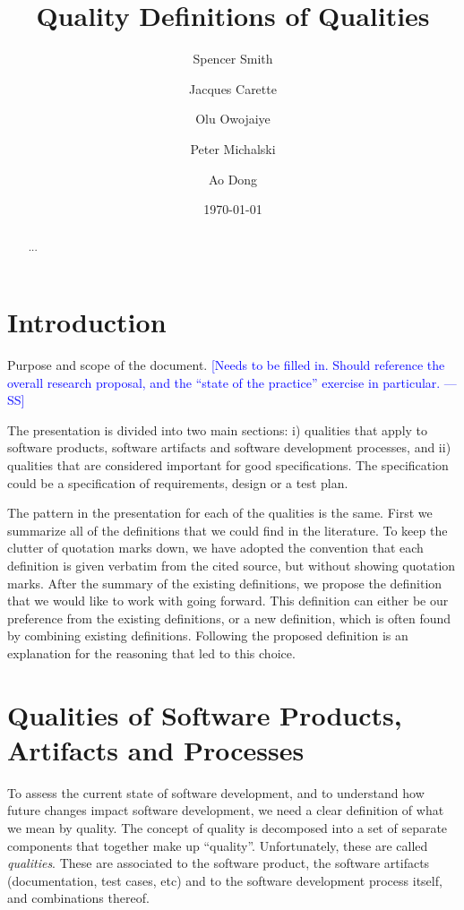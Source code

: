 \documentclass[letterpaper,cleveref]{lipics-v2019}
\title{Quality Definitions of Qualities}
\author{Spencer Smith}{McMaster University, Canada}{smiths@mcmaster.ca}{}{}
\author{Jacques Carette}{McMaster University, Canada}{carette@mcmaster.ca}{}{}
\author{Olu Owojaiye}{McMaster University, Canada}{owojaiyo@mcmaster.ca}{}{}
\author{Peter Michalski}{McMaster University, Canada}{michap@mcmaster.ca}{}{}
\author{Ao Dong}{McMaster University, Canada}{}{}{}
\date{\today}
\newcommand{\authornote}[3]{\textcolor{#1}{[#3 ---#2]}}
\newcommand{\authornote}[3]{}
\newcommand{\wss}[1]{\authornote{blue}{SS}{#1}} %
\theoremstyle{definition}
\begin{document}
\maketitle

\begin{abstract}
	...
\end{abstract}

\tableofcontents

\section{Introduction} \label{SecIntroduction}

Purpose and scope of the document.  \wss{Needs to be filled in.  Should
	reference the overall research proposal, and the ``state of the practice''
	exercise in particular.}

The presentation is divided into two main sections: i) qualities that apply to
software products, software artifacts and software development processes, and
ii) qualities that are considered important for good specifications.  The
specification could be a specification of requirements, design or a test plan.

The pattern in the presentation for each of the qualities is the same.  First we
summarize all of the definitions that we could find in the literature.  To keep
the clutter of quotation marks down, we have adopted the convention that each
definition is given verbatim from the cited source, but without showing
quotation marks.  After the summary of the existing definitions, we propose the
definition that we would like to work with going forward.  This definition can
either be our preference from the existing definitions, or a new definition,
which is often found by combining existing definitions.  Following the proposed
definition is an explanation for the reasoning that led to this choice.

\section{Qualities of Software Products, Artifacts and
	Processes} \label{SecQualities}

To assess the current state of software development, and to understand how
future changes impact software development, we need a clear definition of what
we mean by quality.  The concept of quality is decomposed into a set of separate
components that together make up ``quality''. Unfortunately, these are
called \emph{qualities}. These are associated to the software product,
the software artifacts (documentation, test cases, etc) and to the software
development process itself, and combinations thereof.
\end{document}
